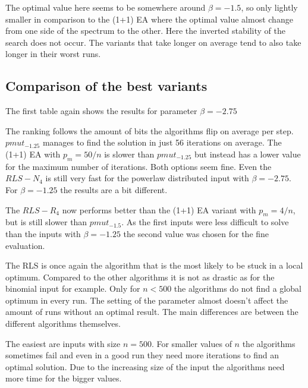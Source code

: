 The optimal value here seems to be somewhere around $\beta=-1.5$, so only lightly smaller in comparison to the (1+1) EA where the optimal value almost change from one side of the spectrum to the other.
Here the inverted stability of the search does not occur.
The variants that take longer on average tend to also take longer in their worst runs.

\subsection{Comparison of the best variants}
The first table again shows the results for parameter $\beta=-2.75$



The ranking follows the amount of bits the algorithms flip on average per step.
$pmut_{-1.25}$ manages to find the solution in just 56 iterations on average.
The (1+1) EA with $p_m=50/n$ is slower than $pmut_{-1.25}$ but instead has a lower value for the maximum number of iterations.
Both options seem fine.
Even the $RLS-N_4$ is still very fast for the powerlaw distributed input with $\beta = -2.75$.
For $\beta = -1.25$ the results are a bit different.



The $RLS-R_4$ now performs better than the (1+1) EA variant with $p_m=4/n$, but is still slower than $pmut_{-1.5}$.
As the first inputs were less difficult to solve than the inputs with $\beta = -1.25$ the second value was chosen for the fine evaluation.



The RLS is once again the algorithm that is the most likely to be stuck in a local optimum.
Compared to the other algorithms it is not as drastic as for the binomial input for example.
Only for $n<500$ the algorithms do not find a global optimum in every run.
The setting of the parameter almost doesn't affect the amount of runs without an optimal result.
The main differences are between the different algorithms themselves.



The easiest are inputs with size $n=500$.
For smaller values of $n$ the algorithms sometimes fail and even in a good run they need more iterations to find an optimal solution.
Due to the increasing size of the input the algorithms need more time for the bigger values.



